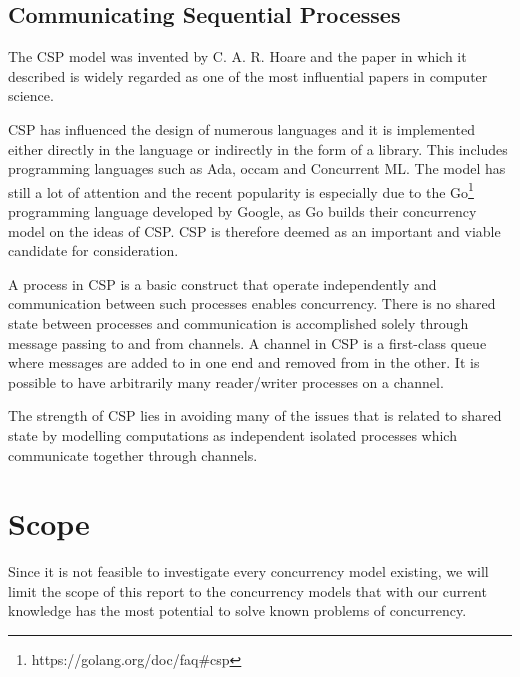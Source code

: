 \subsection{Communicating Sequential Processes}
The \ac{CSP} model was invented by C. A. R. Hoare and the paper in which it described is widely regarded as one of the most influential papers in computer science\cite{abdallah2005communicating}. 

\ac{CSP} has influenced the design of numerous languages and it is implemented either directly in the language or indirectly in the form of a library. This includes programming languages such as Ada, occam and Concurrent ML\cite{abdallah2005communicating}. The model has still a lot of attention and the recent popularity is especially due to the Go\footnote{https://golang.org/doc/faq\#csp} programming language developed by Google, as Go builds their concurrency model on the ideas of \ac{CSP}\cite[Chap. 6]{sevenModels}. \ac{CSP} is therefore deemed as an important and viable candidate for consideration.

A process in \ac{CSP} is a basic construct that operate independently and communication between such processes enables concurrency\cite{ibmCSP}. There is no shared state between processes and communication is accomplished solely through message passing to and from channels. A channel in \ac{CSP} is a first-class queue where messages are added to in one end and removed from in the other\cite[Chap. 6]{sevenModels}. It is possible to have arbitrarily many reader/writer processes on a channel. 

The strength of \ac{CSP} lies in avoiding many of the issues that is related to shared state by modelling computations as independent isolated processes which communicate together through channels. 

\section{Scope}
Since it is not feasible to investigate every concurrency model existing, we will limit the scope of this report to the concurrency models that with our current knowledge has the most potential to solve known problems of concurrency.

